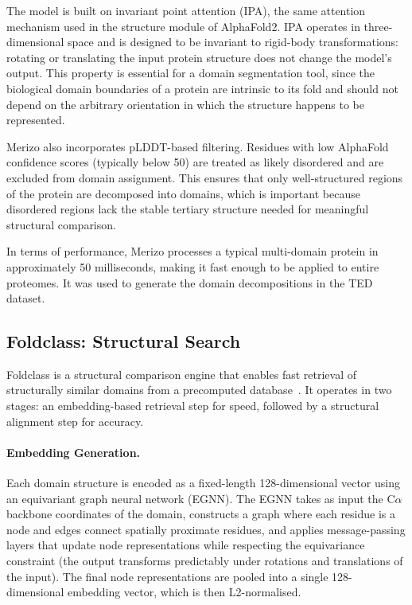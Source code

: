 The model is built on invariant point attention (IPA), the same attention mechanism used in the structure module of AlphaFold2.
IPA operates in three-dimensional space and is designed to be invariant to rigid-body transformations: rotating or translating the input protein structure does not change the model's output.
This property is essential for a domain segmentation tool, since the biological domain boundaries of a protein are intrinsic to its fold and should not depend on the arbitrary orientation in which the structure happens to be represented.

Merizo also incorporates pLDDT-based filtering.
Residues with low AlphaFold confidence scores (typically below 50) are treated as likely disordered and are excluded from domain assignment.
This ensures that only well-structured regions of the protein are decomposed into domains, which is important because disordered regions lack the stable tertiary structure needed for meaningful structural comparison.

In terms of performance, Merizo processes a typical multi-domain protein in approximately 50 milliseconds, making it fast enough to be applied to entire proteomes.
It was used to generate the domain decompositions in the TED dataset.

\subsection{Foldclass: Structural Search}
\label{sec:bg-foldclass}

Foldclass is a structural comparison engine that enables fast retrieval of structurally similar domains from a precomputed database~\cite{merizo_search}.
It operates in two stages: an embedding-based retrieval step for speed, followed by a structural alignment step for accuracy.

\paragraph{Embedding Generation.}
Each domain structure is encoded as a fixed-length 128-dimensional vector using an equivariant graph neural network (EGNN).
The EGNN takes as input the C$\alpha$ backbone coordinates of the domain, constructs a graph where each residue is a node and edges connect spatially proximate residues, and applies message-passing layers that update node representations while respecting the equivariance constraint (the output transforms predictably under rotations and translations of the input).
The final node representations are pooled into a single 128-dimensional embedding vector, which is then L2-normalised.

